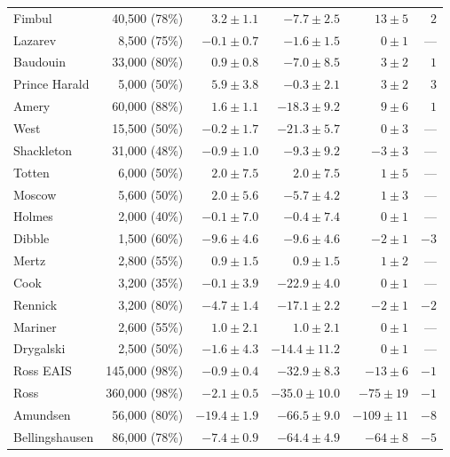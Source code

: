 \begin{footnotesize}
\begin{longtable}{lrrrrr}
Fimbul  	& 40,500    (78\%) & $3.2   \pm 1.1$ & $-7.7  \pm 2.5 $ & $13   \pm 5 $ & $2   $ \\
Lazarev 	& 8,500     (75\%) & $-0.1  \pm 0.7$ & $-1.6  \pm 1.5 $ & $0    \pm 1 $ &  ---   \\
Baudouin 	& 33,000    (80\%) & $0.9   \pm 0.8$ & $-7.0  \pm 8.5 $ & $3    \pm 2 $ & $1   $ \\
Prince Harald 	& 5,000     (50\%) & $5.9   \pm 3.8$ & $-0.3  \pm 2.1 $ & $3    \pm 2 $ & $3   $ \\
Amery 	        & 60,000    (88\%) & $1.6   \pm 1.1$ & $-18.3 \pm 9.2 $ & $9    \pm 6 $ & $1   $ \\
West 	        & 15,500    (50\%) & $-0.2  \pm 1.7$ & $-21.3 \pm 5.7 $ & $0    \pm 3 $ &  ---   \\
Shackleton 	& 31,000    (48\%) & $-0.9  \pm 1.0$ & $-9.3  \pm 9.2 $ & $-3   \pm 3 $ &  ---   \\
Totten  	& 6,000     (50\%) & $2.0   \pm 7.5$ & $2.0   \pm 7.5 $ & $1    \pm 5 $ &  ---   \\
Moscow  	& 5,600     (50\%) & $2.0   \pm 5.6$ & $-5.7  \pm 4.2 $ & $1    \pm 3 $ &  ---   \\
Holmes  	& 2,000     (40\%) & $-0.1  \pm 7.0$ & $-0.4  \pm 7.4 $ & $0    \pm 1 $ &  ---   \\
Dibble  	& 1,500     (60\%) & $-9.6  \pm 4.6$ & $-9.6  \pm 4.6 $ & $-2   \pm 1 $ & $-3  $ \\
Mertz 	        & 2,800     (55\%) & $0.9   \pm 1.5$ & $0.9   \pm 1.5 $ & $1    \pm 2 $ &  ---   \\
Cook 	        & 3,200     (35\%) & $-0.1  \pm 3.9$ & $-22.9 \pm 4.0 $ & $0    \pm 1 $ &  ---   \\
Rennick 	& 3,200     (80\%) & $-4.7  \pm 1.4$ & $-17.1 \pm 2.2 $ & $-2   \pm 1 $ & $-2  $ \\
Mariner 	& 2,600     (55\%) & $1.0   \pm 2.1$ & $1.0   \pm 2.1 $ & $0    \pm 1 $ &  ---   \\
Drygalski 	& 2,500     (50\%) & $-1.6  \pm 4.3$ & $-14.4 \pm 11.2$ & $0    \pm 1 $ &  ---   \\
Ross EAIS 	& 145,000   (98\%) & $-0.9  \pm 0.4$ & $-32.9 \pm 8.3 $ & $-13  \pm 6 $ & $-1  $ \\
Ross	        & 360,000   (98\%) & $-2.1  \pm 0.5$ & $-35.0 \pm 10.0$ & $-75  \pm 19$ & $-1  $ \\
Amundsen 	& 56,000    (80\%) & $-19.4 \pm 1.9$ & $-66.5 \pm 9.0 $ & $-109 \pm 11$ & $-8  $ \\
Bellingshausen  & 86,000    (78\%) & $-7.4  \pm 0.9$ & $-64.4 \pm 4.9 $ & $-64  \pm 8 $ & $-5  $ \\

\end{longtable}
\end{footnotesize}
